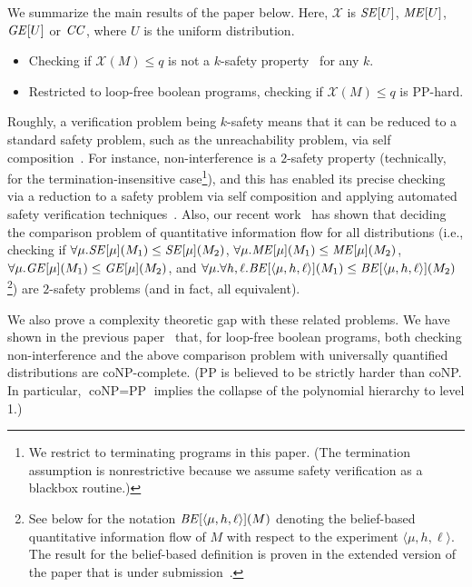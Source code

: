 \documentclass{llncs}
\newcommand{\aseq}[1]{\langle#1\rangle}
\begin{document}
We summarize the main results of the paper below.  Here, $\mathcal{X}$
is ${\it SE}[U]$, ${\it ME}[U]$, ${\it GE}[U]$ or ${\it CC}$, where $U$
is the uniform distribution.
\begin{itemize}
\item Checking if $\mathcal{X}(M) \leq q$ is not a $k$-safety
  property~\cite{terauchi:sas05,DBLP:conf/csfw/ClarksonS08} for any $k$.
\item Restricted to loop-free boolean programs, checking if
$\mathcal{X}(M) \leq q$ is PP-hard.
\end{itemize}
Roughly, a verification problem being $k$-safety means that it can be
reduced to a standard safety problem, such as the unreachability
problem, via self composition~\cite{barthe:csfw04,darvas:spc05}.  For
instance, non-interference is a $2$-safety property (technically, for
the termination-insensitive case\footnote{We restrict to terminating
  programs in this paper.  (The termination assumption is
  nonrestrictive because we assume safety verification as a blackbox
  routine.)}), and this has enabled its precise checking via a
reduction to a safety problem via self composition and applying
automated safety verification
techniques~\cite{terauchi:sas05,naumann:esorics06,unno:plas2006}.
Also, our recent work~\cite{DBLP:conf/csfw/yasuoka2010} has shown that
deciding the comparison problem of quantitative information flow for
all distributions (i.e., checking if $\forall \mu.  {\it SE}[\mu](M_1)
\leq {\it SE}[\mu](M_2)$, $\forall \mu.  {\it ME}[\mu](M_1) \leq {\it
  ME}[\mu](M_2)$, $\forall \mu.  {\it GE}[\mu](M_1) \leq {\it
  GE}[\mu](M_2)$, and $\forall \mu.\forall h,\ell. {\it
  BE}[\aseq{\mu,h,\ell}](M_1) \leq {\it
  BE}[\aseq{\mu,h,\ell}](M_2)$\footnote{See below for the notation
  ${\it BE}[\aseq{\mu,h,\ell}](M)$ denoting the belief-based
  quantitative information flow of $M$ with respect to the experiment
  $\aseq{\mu,h,\ell}$.  The result for the belief-based definition is
  proven in the extended version of the paper that is under
  submission~\cite{yasuoka:toplas2010submit}.}) are $2$-safety problems
(and in fact, all equivalent).

We also prove a complexity theoretic gap with these related problems.
We have shown in the previous paper~\cite{DBLP:conf/csfw/yasuoka2010}
that, for loop-free boolean programs, both checking non-interference
and the above comparison problem with universally quantified
distributions are coNP-complete.  (PP is believed to be strictly
harder than coNP.  In particular, $\text{coNP} = \text{PP}$ implies
the collapse of the polynomial hierarchy to level 1.)
\end{document}
